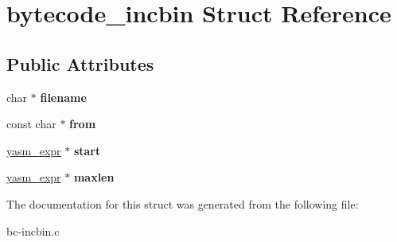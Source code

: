 \hypertarget{structbytecode__incbin}{\section{bytecode\-\_\-incbin Struct Reference}
\label{structbytecode__incbin}
}
\subsection*{Public Attributes}
\begin{DoxyCompactItemize}
\item 
\hypertarget{structbytecode__incbin_a3007505dc727b7d4866956443e4f27de}{char $\ast$ {\bfseries filename}}\label{structbytecode__incbin_a3007505dc727b7d4866956443e4f27de}

\item 
\hypertarget{structbytecode__incbin_a63432d5402e198bee3119e27e947230c}{const char $\ast$ {\bfseries from}}\label{structbytecode__incbin_a63432d5402e198bee3119e27e947230c}

\item 
\hypertarget{structbytecode__incbin_a79f0283396fbdada3ee3c2d243f24918}{\hyperlink{structyasm__expr}{yasm\-\_\-expr} $\ast$ {\bfseries start}}\label{structbytecode__incbin_a79f0283396fbdada3ee3c2d243f24918}

\item 
\hypertarget{structbytecode__incbin_a3057b5022a913720f1600fef90c9b8b0}{\hyperlink{structyasm__expr}{yasm\-\_\-expr} $\ast$ {\bfseries maxlen}}\label{structbytecode__incbin_a3057b5022a913720f1600fef90c9b8b0}

\end{DoxyCompactItemize}


The documentation for this struct was generated from the following file\-:\begin{DoxyCompactItemize}
\item 
bc-\/incbin.\-c\end{DoxyCompactItemize}
